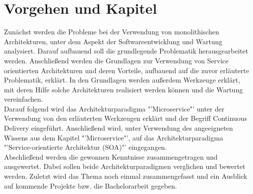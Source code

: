 \section{Vorgehen und Kapitel}
\label{sec:vorgehen}
Zunächst werden die Probleme bei der Verwendung von monolithischen Architekturen, unter dem Aspekt der Softwareentwicklung und Wartung analysiert. Darauf aufbauend soll die grundlegende Problematik herausgearbeitet werden. Anschließend werden die Grundlagen zur Verwendung von Service orientierten Architekturen und deren Vorteile, aufbauend auf die zuvor erläuterte Problematik, erklärt. In den Grundlagen werden außerdem Werkzeuge erklärt, mit deren Hilfe solche Architekturen realisiert werden können und die Wartung vereinfachen.
\\
Darauf folgend wird das Architekturparadigma "'Microservice"' unter der Verwendung von den erläuterten Werkzeugen erklärt und der Begriff Continuous Delivery eingeführt. Anschließend wird, unter Verwendung des angeeigneten Wissens aus dem Kapitel "'Microservice"', auf das Architekturparadigma "'Service-orientierte Architektur (SOA)"' eingegangen.
\\
Abschließend werden die gewonnen Kenntnisse zusammengetragen und ausgewertet. Dabei sollen beide Architekturparadigmen verglichen und bewertet werden. Zuletzt wird das Thema noch einmal zusammengefasst und ein Ausblick auf kommende Projekte bzw. die Bachelorarbeit gegeben.